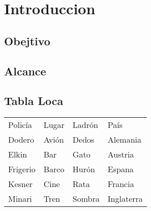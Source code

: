 \section{Introduccion}
\subsection{Obejtivo}
\subsection{Alcance}

\subsection{Tabla Loca}

\begin{center} %
\begin{tabularx}{0.97\linewidth}{XXXX} %

Policía &	Lugar	&	Ladrón	&	País		\\
Dodero	&	Avión	&	Dedos	&	Alemania	\\
Elkin	&	Bar	&	Gato	&	Austria		\\
Frigerio&	Barco	&	Hurón	&	Espana		\\
Kesner	&	Cine	&	Rata	&	Francia		\\
Minari	&	Tren	&	Sombra	&	Inglaterra	\\

\end{tabularx}
\end{center}
